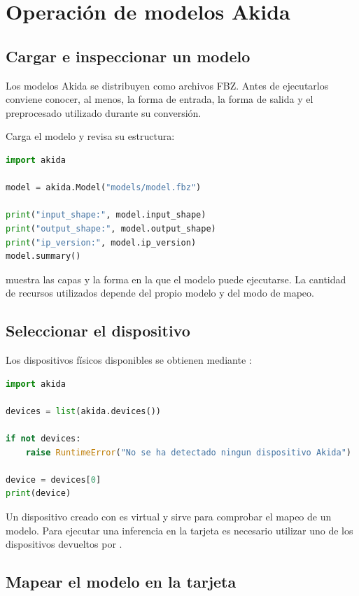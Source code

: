 \chapter{Operación de modelos Akida}
\label{chap:operacion}

\section{Cargar e inspeccionar un modelo}

Los modelos Akida se distribuyen como archivos FBZ. Antes de ejecutarlos conviene conocer,
al menos, la forma de entrada, la forma de salida y el preprocesado utilizado durante su
conversión.

Carga el modelo y revisa su estructura:

\begin{lstlisting}[language=Python]
import akida

model = akida.Model("models/model.fbz")

print("input_shape:", model.input_shape)
print("output_shape:", model.output_shape)
print("ip_version:", model.ip_version)
model.summary()
\end{lstlisting}

 muestra las capas y la forma en la que el modelo puede ejecutarse.
La cantidad de recursos utilizados depende del propio modelo y del modo de mapeo.

\section{Seleccionar el dispositivo}

Los dispositivos físicos disponibles se obtienen mediante 
\cite{brainchip_akida_guide}:

\begin{lstlisting}[language=Python]
import akida

devices = list(akida.devices())

if not devices:
    raise RuntimeError("No se ha detectado ningun dispositivo Akida")

device = devices[0]
print(device)
\end{lstlisting}

Un dispositivo creado con  es virtual y sirve para comprobar
el mapeo de un modelo. Para ejecutar una inferencia en la tarjeta es necesario utilizar
uno de los dispositivos devueltos por .

\section{Mapear el modelo en la tarjeta}

